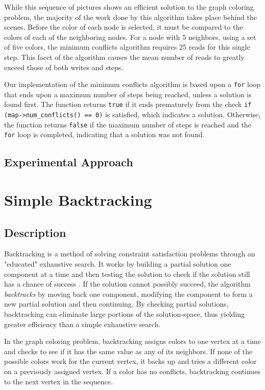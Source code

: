 \documentclass{article}
\begin{document}
		While this sequence of pictures shows an efficient solution to the graph coloring problem, the majority of the work done by this algorithm takes place behind the scenes.  Before the color of each node is selected, it must be compared to the colors of each of the neighboring nodes.  For a node with 5 neighbors, using a set of five colors, the minimum conflicts algorithm requires 25 reads for this single step.  This facet of the algorithm causes the mean number of reads to greatly exceed those of both writes and steps.

		Our implementation of the minimum conflicts algorithm is based upon a \texttt{for} loop that ends upon a maximum number of steps being reached, unless a solution is found first.  The function returns \texttt{true} if it ends prematurely from the check \texttt{if (map->num_conflicts() == 0)} is satisfied, which indicates a solution.  Otherwise, the function returns \texttt{false} if the maximum number of steps is reached and the \texttt{for} loop is completed, indicating that a solution was not found.
	\subsection{Experimental Approach}

\section{Simple Backtracking}
	\subsection{Description}
		\label{simpe_desc}
		Backtracking is a method of solving constraint satisfaction problems through an "educated" exhaustive search. It works by building a partial solution one component at a time and then testing the solution to check if the solution still has a chance of success \cite{Golomb}. If the solution cannot possibly succeed, the algorithm \textit{backtracks} by moving back one component, modifying the component to form a new partial solution and then continuing. By checking partial solutions, backtracking can eliminate large portions of the solution-space, thus yielding greater efficiency than a simple exhaustive search.
		
		In the graph coloring problem, backtracking assigns colors to one vertex at a time and checks to see if it has the same value as any of its neighbors. If none of the possible colors work for the current vertex, it backs up and tries a different color on a previously assigned vertex. If a color has no conflicts, backtracking continues to the next vertex in the sequence.
		
\end{document}
